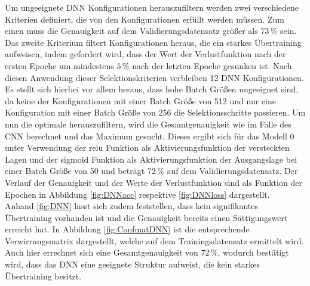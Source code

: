 \setcounter{subfigure}{0}
Um ungeeignete DNN Konfigurationen herauszufiltern werden zwei verschiedene Kriterien definiert, die von den Konfigurationen erfüllt werden müssen. Zum einen muss die Genauigkeit auf dem Validierungsdatensatz größer als $73\,\%$ sein. Das zweite Kriterium filtert Konfigurationen heraus, die ein starkes Übertraining aufweisen, indem gefordert wird, dass der Wert der Verlustfunktion nach der ersten Epoche um mindestens $5\,\%$ nach der letzten Epoche gesunken ist. Nach diesen Anwendung dieser Selektionskriterien verbleiben 12 DNN Konfigurationen. Es stellt sich hierbei vor allem heraus, dass hohe Batch Größen ungeeignet sind, da keine der Konfigurationen mit einer Batch Größe von 512 und nur eine Konfiguration mit einer Batch Größe von 256 die Selektionsschritte passieren. Um nun die optimale herauszufiltern, wird die Gesamtgenauigkeit wie im Falle des CNN berechnet und das Maximum gesucht. Dieses ergibt sich für das Modell 0 unter Verwendung der relu Funktion als Aktivierungsfunktion der versteckten Lagen und der sigmoid Funktion als Aktivierungsfunktion der Ausgangslage bei einer Batch Größe von 50 und beträgt $72\,\%$ auf dem Validierungsdatensatz. Der Verlauf der Genauigkeit und der Werte der Verlustfunktion sind als Funktion der Epochen in Abbildung \ref{fig:DNNacc} respektive \ref{fig:DNNloss} dargestellt. \\
Anhand \ref{fig:DNN} lässt sich zudem feststellen, dass kein signifikantes Übertraining vorhanden ist und die Genauigkeit bereits einen Sättigungswert erreicht hat. In Abbildung \ref{fig:ConfmatDNN} ist die entsprechende Verwirrungsmatrix dargestellt, welche auf dem Trainingsdatensatz ermittelt wird. Auch hier errechnet sich eine Gesamtgenauigkeit von $72\,\%$, wodurch bestätigt wird, dass das DNN eine geeignete Struktur aufweist, die kein starkes Übertraining besitzt. 
